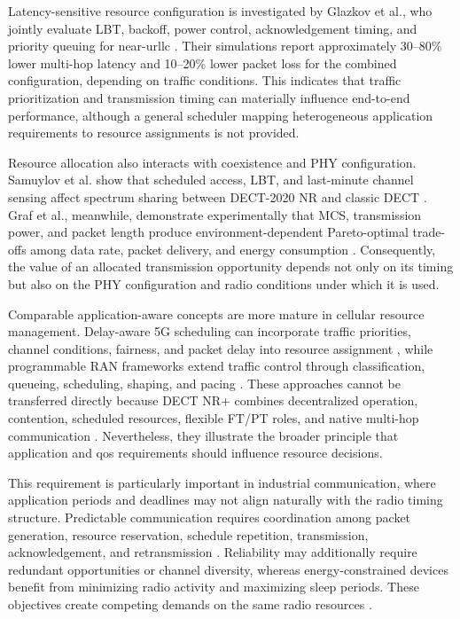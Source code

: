 Latency-sensitive resource configuration is investigated by Glazkov et al., who jointly evaluate LBT, backoff, power control, acknowledgement timing, and priority queuing for near-\gls{urllc} \cite{glazkovImprovingNearURLLCServices2025}. Their simulations report approximately 30--80\% lower multi-hop latency and 10--20\% lower packet loss for the combined configuration, depending on traffic conditions. This indicates that traffic prioritization and transmission timing can materially influence end-to-end performance, although a general scheduler mapping heterogeneous application requirements to resource assignments is not provided.

Resource allocation also interacts with coexistence and PHY configuration. Samuylov et al. show that scheduled access, LBT, and last-minute channel sensing affect spectrum sharing between DECT-2020 NR and classic DECT \cite{samuylovPerformanceAssessmentDECT20202023}. Graf et al., meanwhile, demonstrate experimentally that MCS, transmission power, and packet length produce environment-dependent Pareto-optimal trade-offs among data rate, packet delivery, and energy consumption \cite{grafParetoOptimalityApproach2026a}. Consequently, the value of an allocated transmission opportunity depends not only on its timing but also on the PHY configuration and radio conditions under which it is used.

Comparable application-aware concepts are more mature in cellular resource management. Delay-aware 5G scheduling can incorporate traffic priorities, channel conditions, fairness, and packet delay into resource assignment \cite{madiDelayBasedResourceAllocation2022a}, while programmable RAN frameworks extend traffic control through classification, queueing, scheduling, shaping, and pacing \cite{irazabalTCRANProgrammableTraffic2024}. These approaches cannot be transferred directly because DECT NR+ combines decentralized operation, contention, scheduled resources, flexible FT/PT roles, and native multi-hop communication \cite{etsi_ts103636_1,etsi_ts103636_4}. Nevertheless, they illustrate the broader principle that application and \gls{qos} requirements should influence resource decisions.

This requirement is particularly important in industrial communication, where application periods and deadlines may not align naturally with the radio timing structure. Predictable communication requires coordination among packet generation, resource reservation, schedule repetition, transmission, acknowledgement, and retransmission \cite{etsi_ts103636_3,etsi_ts103636_4}. Reliability may additionally require redundant opportunities or channel diversity, whereas energy-constrained devices benefit from minimizing radio activity and maximizing sleep periods. These objectives create competing demands on the same radio resources \cite{glazkovImprovingNearURLLCServices2025, samuylovEmpoweringNearURLLCIoT2025, grafParetoOptimalityApproach2026a}.

